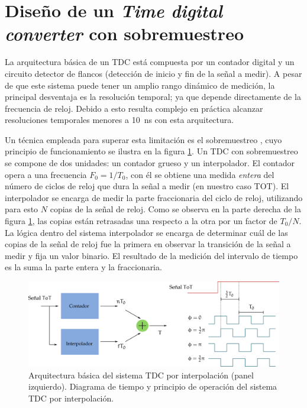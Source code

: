 \section{Diseño de un \emph{Time digital converter} con sobremuestreo}

La arquitectura básica de un TDC está compuesta por un contador digital y un circuito detector de flancos (detección de inicio y fin de la señal a medir). A pesar de que este sistema puede tener un amplio rango dinámico de medición, la principal desventaja es la resolución temporal; ya que depende directamente de la frecuencia de reloj. Debido a esto resulta complejo en práctica alcanzar resoluciones temporales menores a \SI{10}{\nano\second} con esta arquitectura.

Un técnica empleada para superar esta limitación es el sobremuestreo \cite{spencer06,balla14}, cuyo principio de funcionamiento se ilustra en la figura \ref{fig:tdc-diagram}. Un TDC con sobremuestreo se compone de dos unidades: un contador grueso y un interpolador. El contador opera a una frecuencia $F_{0}=1/T_{0}$, con él se obtiene una medida \emph{entera} del número de ciclos de reloj que dura la señal a medir (en nuestro caso TOT). El interpolador se encarga de medir la parte fraccionaria del ciclo de reloj, utilizando para esto $N$ copias de la señal de reloj. Como se observa en la parte derecha de la figura \ref{fig:tdc-diagram}, las copias están retrasadas una respecto a la otra por un factor de $T_{0}/N$.  La lógica dentro del sistema interpolador se encarga de determinar cuál de las copias de la señal de reloj fue la primera en observar la transición de la señal a medir y fija un valor binario. El resultado de la medición del intervalo de tiempo es la suma la parte entera y la fraccionaria.

\begin{figure}
        \centering
        \includegraphics[width=\textwidth]{tdc-diagram.pdf}
        \caption{Arquitectura básica del sistema TDC por interpolación (panel izquierdo). Diagrama de tiempo y principio de operación del sistema TDC por interpolación.}
        \label{fig:tdc-diagram}
\end{figure}

